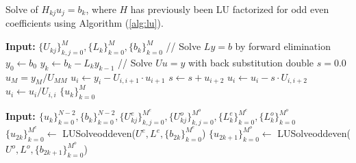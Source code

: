 \documentclass[11pt, oneside]{article}
\begin{document}
\begin{algorithm}
\caption{Solve of $H_{kj}u_j = b_k$, where $H$ has previously been LU 
factorized for odd even coefficients using Algorithm (\ref{alg:lu}).}
\label{alg:lusolve}
\begin{algorithmic}[1]
  \State \textbf{Input:} $\{U_{kj}\}_{k,j=0}^{M}, \{L_k\}_{k=0}^{M}, 
\{b_k\}_{k=0}^{M}$ 
  \State // Solve $Ly=b$ by forward elimination 
  \State $y_0 \gets b_0$
    \State $y_k \gets b_k - L_ky_{k-1}$
  \EndFor
  \State // Solve $Uu=y$ with back substitution
  \State double $s = 0.0$     
  \State $u_M = y_M / U_{MM}$    
     \State $u_i \gets y_i - U_{i, i+1}\cdot u_{i+1}$
       \State $s \gets s + u_{i+2}$
       \State $u_i \gets u_i - s\cdot U_{i,i+2}$            
     \EndIf
     \State $u_i \gets  u_i / U_{i,i}$
   \EndFor
  \State \Return $\{u_k\}_{k=0}^{M}$  
\EndProcedure
\end{algorithmic}
\begin{algorithmic}[1]
  \State \textbf{Input: $\{u_k\}_{k=0}^{N-2}, \{b_k\}_{k=0}^{N-2}, 
\{U_{kj}^{e}\}_{k,j=0}^{M^{e}}, \{U_{kj}^{o}\}_{k,j=0}^{M^{o}}, 
\{L^{e}_k\}_{k=0}^{M^{e}}, \{L^{o}_k\}_{k=0}^{M^{o}}$}
  \State $\{u_{2k}\}_{k=0}^{M^e} \gets $ LUSolveoddeven($U^{e}, L^e, 
\{b_{2k}\}_{k=0}^{M^e}$)
  \State $\{u_{2k+1}\}_{k=0}^{M^o} \gets $ LUSolveoddeven($U^{o}, L^o, 
\{b_{2k+1}\}_{k=0}^{M^o}$)
  
\EndProcedure
\end{algorithmic}

\end{algorithm}
\end{document}
